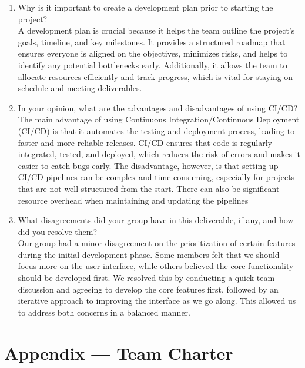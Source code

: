 \documentclass{article}
\begin{document}
\begin{enumerate}
    \item Why is it important to create a development plan prior to starting the
    project?\\
    A development plan is crucial because it helps the team outline the project’s
    goals, timeline, and key milestones. It provides a structured roadmap that
    ensures everyone is aligned on the objectives, minimizes risks, and helps
    to identify any potential bottlenecks early. Additionally, it allows the team
    to allocate resources efficiently and track progress, which is vital for staying
    on schedule and meeting deliverables.

    \item In your opinion, what are the advantages and disadvantages of using
    CI/CD?\\
    The main advantage of using Continuous Integration/Continuous Deployment (CI/CD)
    is that it automates the testing and deployment process, leading to faster and 
    more reliable releases. CI/CD ensures that code is regularly integrated, tested,
    and deployed, which reduces the risk of errors and makes it easier to catch bugs early. 
    The disadvantage, however, is that setting up CI/CD pipelines can be complex and 
    time-consuming, especially for projects that are not well-structured from the start. 
    There can also be significant resource overhead when maintaining and updating the pipelines

    \item What disagreements did your group have in this deliverable, if any,
    and how did you resolve them?\\
    Our group had a minor disagreement on the prioritization of certain features during 
    the initial development phase. Some members felt that we should focus more on the 
    user interface, while others believed the core functionality should be developed first.
    We resolved this by conducting a quick team discussion and agreeing to develop the core
    features first, followed by an iterative approach to improving the interface as we go along.
     This allowed us to address both concerns in a balanced manner.
\end{enumerate}

\newpage{}

\section*{Appendix --- Team Charter}
\end{document}
